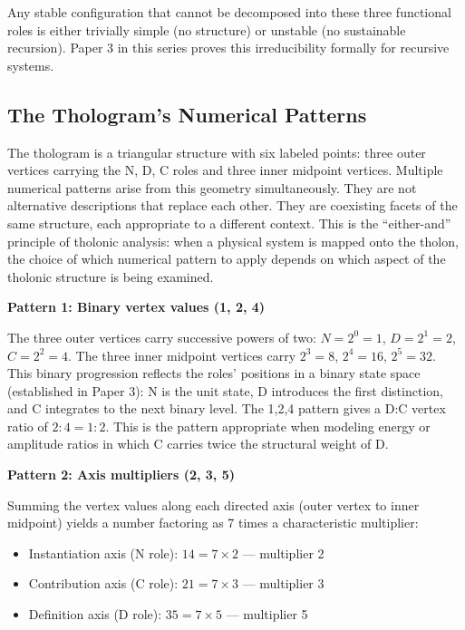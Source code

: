 \documentclass[12pt]{article}
\providecommand{\tightlist}{%
  \setlength{\itemsep}{0pt}\setlength{\parskip}{0pt}}
\begin{document}
Any stable configuration that cannot be decomposed into these three
functional roles is either trivially simple (no structure) or unstable
(no sustainable recursion). Paper 3 in this series proves this
irreducibility formally for recursive systems.

\subsection{The Thologram's Numerical Patterns}\label{the-tholograms-numerical-patterns}

The thologram is a triangular structure with six labeled points: three
outer vertices carrying the N, D, C roles and three inner midpoint
vertices. Multiple numerical patterns arise from this geometry
simultaneously. They are not alternative descriptions that replace each
other. They are coexisting facets of the same structure, each
appropriate to a different context. This is the ``either-and'' principle
of tholonic analysis: when a physical system is mapped onto the tholon,
the choice of which numerical pattern to apply depends on which aspect
of the tholonic structure is being examined.

\textbf{Pattern 1: Binary vertex values (1, 2, 4)}

The three outer vertices carry successive powers of two:
\(N = 2^0 = 1\), \(D = 2^1 = 2\), \(C = 2^2 = 4\). The three inner
midpoint vertices carry \(2^3 = 8\), \(2^4 = 16\), \(2^5 = 32\). This
binary progression reflects the roles' positions in a binary state space
(established in Paper 3): N is the unit state, D introduces the first
distinction, and C integrates to the next binary level. The 1,2,4
pattern gives a D:C vertex ratio of \(2:4 = 1:2\). This is the pattern
appropriate when modeling energy or amplitude ratios in which C carries
twice the structural weight of D.

\textbf{Pattern 2: Axis multipliers (2, 3, 5)}

Summing the vertex values along each directed axis (outer vertex to
inner midpoint) yields a number factoring as 7 times a characteristic
multiplier:

\begin{itemize}
\tightlist
\item
  Instantiation axis (N role): \(14 = 7 \times 2\) --- multiplier 2
\item
  Contribution axis (C role): \(21 = 7 \times 3\) --- multiplier 3
\item
  Definition axis (D role): \(35 = 7 \times 5\) --- multiplier 5
\end{itemize}
\end{document}
